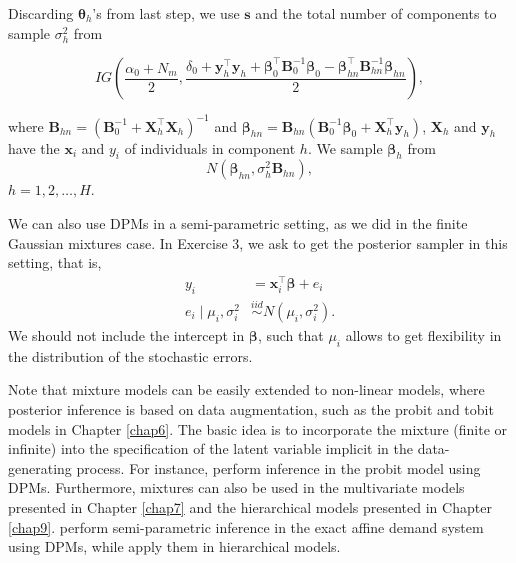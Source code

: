 Discarding $\boldsymbol\theta_h$'s from last step, we use $\boldsymbol s$ and the total number of components to sample $\sigma_h^2$ from 

\begin{equation*}
	IG\left(\frac{\alpha_0+N_m}{2},\frac{\delta_0+\boldsymbol y_h^{\top}\boldsymbol y_h+\boldsymbol{\beta}_0^{\top}{\boldsymbol{B}}_0^{-1}\boldsymbol{\beta}_0-\boldsymbol{\beta}_{hn}^{\top}{\boldsymbol{B}}_{hn}^{-1}\boldsymbol{\beta}_{hn}}{2}\right),
\end{equation*}

where $\boldsymbol{B}_{hn}=(\boldsymbol{B}_0^{-1}+\boldsymbol{X}_h^{\top}\boldsymbol{X}_h)^{-1}$ and $\boldsymbol{\beta}_{hn}=\boldsymbol{B}_{hn}(\boldsymbol{B}_0^{-1}\boldsymbol{\beta}_0+\boldsymbol{X}_h^{\top}\boldsymbol{y}_h)$, $\boldsymbol{X}_h$ and $\boldsymbol{y}_h$ have the $\boldsymbol{x}_i$ and $y_i$ of individuals in component $h$. We sample $\boldsymbol\beta_h$ from
\begin{equation*}
	N\left({\boldsymbol\beta}_{hn},\sigma_h^2\boldsymbol B_{hn}\right),
\end{equation*}
$h=1,2,\dots,H$.

We can also use DPMs in a semi-parametric setting, as we did in the finite Gaussian mixtures case. In Exercise 3, we ask to get the posterior sampler in this setting, that is,
\begin{align*}
	y_i&=\boldsymbol{x}_i^{\top}\boldsymbol{\beta}+e_i\\
	e_i\mid \mu_i,\sigma_i^2 &\stackrel{iid}{\sim} N(\mu_i,\sigma_i^2).
\end{align*}
We should not include the intercept in $\boldsymbol{\beta}$, such that $\mu_i$ allows to get flexibility in the distribution of the stochastic errors.

Note that mixture models can be easily extended to non-linear models, where posterior inference is based on data augmentation, such as the probit and tobit models in Chapter \ref{chap6}. The basic idea is to incorporate the mixture (finite or infinite) into the specification of the latent variable implicit in the data-generating process. For instance, \cite{basu2003marginal} perform inference in the probit model using DPMs. Furthermore, mixtures can also be used in the multivariate models presented in Chapter \ref{chap7} and the hierarchical models presented in Chapter \ref{chap9}. \cite{ramirez2024welfare} perform semi-parametric inference in the exact affine demand system \cite{lewbel2009tricks} using DPMs, while \cite{basu2003marginal} apply them in hierarchical models.

